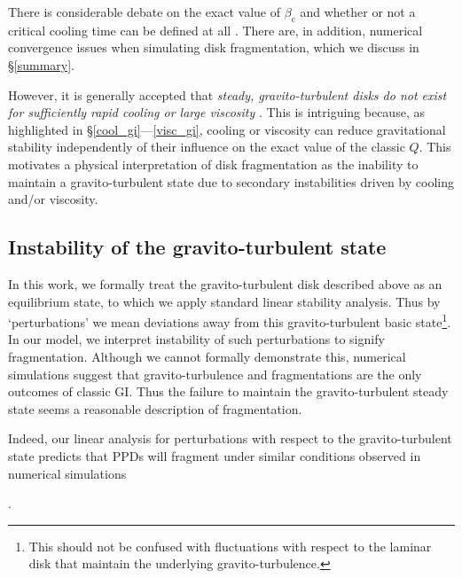 \documentclass[iop, numberedappendix]{emulateapj}
\begin{document}
There is considerable debate on the exact value of $\beta_\mathrm{c}$  
and whether or not a critical cooling time can be defined at all
\citep{meru11,lodato11,meru12,paardekooper12,hopkins13}. There are, in
addition, numerical convergence issues when simulating disk  
fragmentation, which we discuss in \S\ref{summary}. 

However, it is generally accepted that \emph{steady, gravito-turbulent
  disks do not  
  exist for sufficiently rapid cooling or large viscosity} \citep{johnson03}.   
This is intriguing because, as highlighted in
\S\ref{cool_gi}---\ref{visc_gi}, cooling or viscosity can reduce 
gravitational stability independently of their influence on the exact
value of the classic $Q$. This 
motivates a physical      
interpretation of disk fragmentation as the inability to maintain a
gravito-turbulent state due to 
secondary instabilities driven by cooling and/or viscosity.

{\bf 
\subsection{Instability of the gravito-turbulent state}\label{gi_of_gi}
  In this work, we formally treat the gravito-turbulent
  disk described above as an equilibrium state, to which we apply    
  standard linear stability analysis. Thus by `perturbations' we mean   
  deviations away from this gravito-turbulent 
  basic state\footnote{This should not be confused with 
    fluctuations with respect to the 
    laminar disk that maintain the underlying
    gravito-turbulence.}. 
  In our model, we interpret instability of such perturbations  to 
  signify fragmentation. Although we cannot formally demonstrate this, numerical
  simulations suggest that gravito-turbulence and fragmentations are the
  only outcomes of classic GI. Thus the failure to maintain the 
  gravito-turbulent steady state seems a reasonable description of
  fragmentation. 

Indeed, our linear analysis for perturbations with respect to the 
gravito-turbulent state predicts that PPDs will fragment under similar
conditions observed in numerical simulations} \citep[e.g. $\beta_c\sim
  3,\,\alpha_c\sim0.1$,][]{gammie01,rice05}. 
\end{document}
